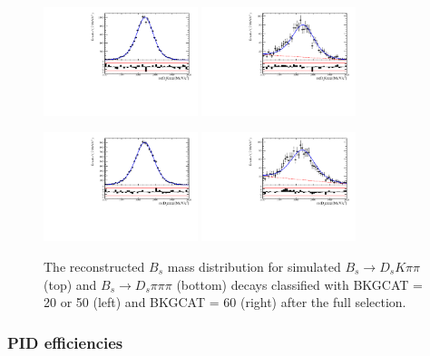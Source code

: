 \begin{figure}[h]
\centering
\includegraphics[height=!,width=0.4\textwidth]{figs/MassFit/signalMC_pull.pdf}
\includegraphics[height=!,width=0.4\textwidth]{figs/MassFit/signalMC_ghost_pull.pdf}

\includegraphics[height=!,width=0.4\textwidth]{figs/MassFit/normMC_pull.pdf}
\includegraphics[height=!,width=0.4\textwidth]{figs/MassFit/normMC_ghost_pull.pdf}

\caption{The reconstructed $B_s$ mass distribution for simulated $B_s \to D_s K \pi \pi$ (top) and $B_s \to D_s \pi \pi \pi$ (bottom) decays 
classified with \textsf{BKGCAT} = 20 or 50 (left) and \textsf{BKGCAT} = 60 (right) after the full selection. }
\label{fig:}
\end{figure}

\clearpage
\subsubsection{PID efficiencies}


